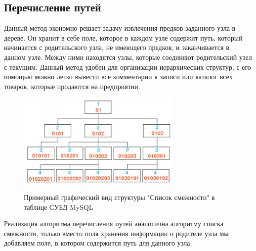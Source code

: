 \documentclass[a4paper,14pt]{extreport}
\theoremstyle{definition}
\begin{document}
\subsection{Перечисление путей}
Данный метод экономно решает задачу извлечения предков заданного узла в дереве. Он хранит в себе поле, которое в каждом узле содержит путь, который начинается с родительского узла, не имеющего предков, и заканчивается в данном узле. Между ними находятся узлы, которые соединяют родительский узел с текущим.
Данный метод удобен для организации иерархических структур, с его помощью можно легко вывести все комментарии к записи или каталог всех товаров, которые продаются на предприятии.
\begin{figure}[h!]
\begin{center}
\includegraphics[width=8cm]{12.png}
\caption{Примерный графический вид структуры "Список смежности" в таблице СУБД MySQL}
\label{fig:3}
\end{center}
\end{figure}
Реализация алгоритма перечисления путей аналогична алгоритму списка смежности, только вместо поля хранения информации о родителе узла мы добавляем поле, в котором содержится путь для данного узла.
\end{document}
